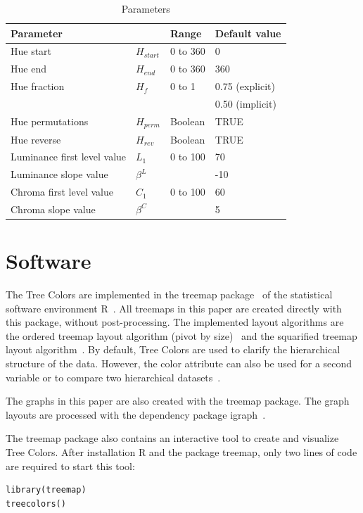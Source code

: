 \documentclass[journal]{vgtc}                %
\begin{document}
\begin{table}[tb]
\begin{footnotesize}
\begin{tabular}{llll}
\toprule
\multicolumn{2}{l}{Parameter    } & Range & Default value \\
\midrule
Hue start 				& $H_{start}$ &0 to 360  & 0      \\
Hue end   				& $H_{end}$ & 0 to 360 & 360       \\
Hue fraction 				& $H_f$	& 0 to 1 & 0.75 (explicit) \\
					&	&	 & 0.50 (implicit) \\
Hue permutations 			& $H_{perm}$ &Boolean & TRUE      \\
Hue reverse   			& $H_{rev}$ & Boolean  & TRUE      \\
Luminance first level value 	& $L_1$	& 0 to 100  & 70      \\
Luminance slope value 		& $\beta^L$ &       & -10       \\
Chroma first level value 		& $C_1$ &  0 to 100  & 60       \\
Chroma slope value 		& $\beta^C$ &     & 5       \\
\bottomrule
\end{tabular}
\end{footnotesize}
\caption{Parameters}\label{table:param}
\end{table}




\section{Software}

The Tree Colors are implemented in the treemap package~\cite{treemap} of the statistical software environment R~\cite{r2013}. All treemaps in this paper are created directly with this package, without post-processing. The implemented layout algorithms are the ordered treemap layout algorithm (pivot by size)~\cite{Bederson2002} and the squarified treemap layout algorithm~\cite{bruls99}. By default, Tree Colors are used to clarify the hierarchical structure of the data. However, the color attribute can also be used for a second variable or to compare two hierarchical datasets~\cite{tennekes2011b}. 

The graphs in this paper are also created with the treemap package. The graph layouts are processed with the dependency package igraph~\cite{igraph}.

The treemap package also contains an interactive tool to create and visualize Tree Colors. After installation R and the package treemap, only two lines of code are required to start this tool:
\begin{lstlisting}
library(treemap)
treecolors()
\end{lstlisting}
\end{document}
